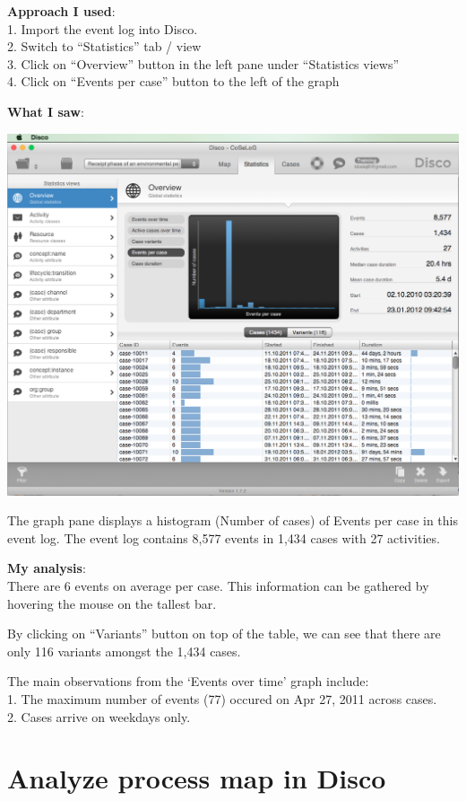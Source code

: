 \documentclass[]{article}
\begin{document}
\textbf{Approach I used}:\\1. Import the event log into Disco.\\2.
Switch to ``Statistics'' tab / view\\3. Click on ``Overview'' button in
the left pane under ``Statistics views''\\4. Click on ``Events per
case'' button to the left of the graph

\textbf{What I saw}:

\includegraphics{CoSeLoG_Step_01_Q_01.png}

The graph pane displays a histogram (Number of cases) of Events per case
in this event log. The event log contains 8,577 events in 1,434 cases
with 27 activities.

\textbf{My analysis}:\\There are 6 events on average per case. This
information can be gathered by hovering the mouse on the tallest bar.

By clicking on ``Variants'' button on top of the table, we can see that
there are only 116 variants amongst the 1,434 cases.

The main observations from the `Events over time' graph include:\\1. The
maximum number of events (77) occured on Apr 27, 2011 across cases.\\2.
Cases arrive on weekdays only.

\section{Analyze process map in
Disco}\label{analyze-process-map-in-disco}
\end{document}
